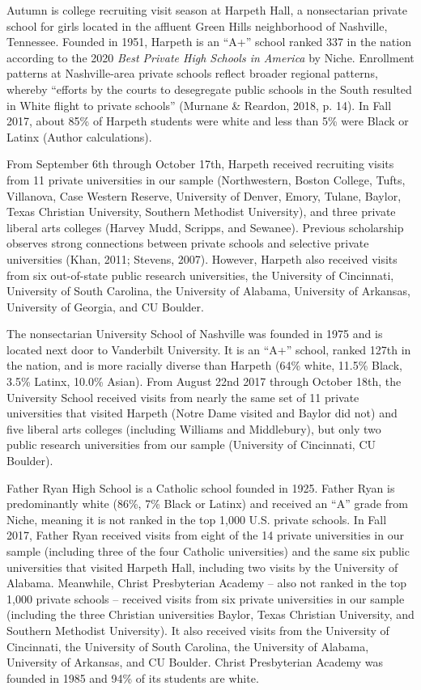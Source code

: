 \documentclass[
  12pt,
]{article}
\begin{document}
\bigskip

Autumn is college recruiting visit season at Harpeth Hall, a nonsectarian private school for girls located in the affluent Green Hills neighborhood of Nashville, Tennessee. Founded in 1951, Harpeth is an ``A+'' school ranked 337 in the nation according to the 2020 \emph{Best Private High Schools in America} by Niche. Enrollment patterns at Nashville-area private schools reflect broader regional patterns, whereby ``efforts by the courts to desegregate public schools in the South resulted in White flight to private schools'' (Murnane \& Reardon, 2018, p. 14). In Fall 2017, about 85\% of Harpeth students were white and less than 5\% were Black or Latinx (Author calculations).

From September 6th through October 17th, Harpeth received recruiting visits from 11 private universities in our sample (Northwestern, Boston College, Tufts, Villanova, Case Western Reserve, University of Denver, Emory, Tulane, Baylor, Texas Christian University, Southern Methodist University), and three private liberal arts colleges (Harvey Mudd, Scripps, and Sewanee). Previous scholarship observes strong connections between private schools and selective private universities (Khan, 2011; Stevens, 2007). However, Harpeth also received visits from six out-of-state public research universities, the University of Cincinnati, University of South Carolina, the University of Alabama, University of Arkansas, University of Georgia, and CU Boulder.

The nonsectarian University School of Nashville was founded in 1975 and is located next door to Vanderbilt University. It is an ``A+'' school, ranked 127th in the nation, and is more racially diverse than Harpeth (64\% white, 11.5\% Black, 3.5\% Latinx, 10.0\% Asian). From August 22nd 2017 through October 18th, the University School received visits from nearly the same set of 11 private universities that visited Harpeth (Notre Dame visited and Baylor did not) and five liberal arts colleges (including Williams and Middlebury), but only two public research universities from our sample (University of Cincinnati, CU Boulder).

Father Ryan High School is a Catholic school founded in 1925. Father Ryan is predominantly white (86\%, 7\% Black or Latinx) and received an ``A'' grade from Niche, meaning it is not ranked in the top 1,000 U.S. private schools. In Fall 2017, Father Ryan received visits from eight of the 14 private universities in our sample (including three of the four Catholic universities) and the same six public universities that visited Harpeth Hall, including two visits by the University of Alabama. Meanwhile, Christ Presbyterian Academy -- also not ranked in the top 1,000 private schools -- received visits from six private universities in our sample (including the three Christian universities Baylor, Texas Christian University, and Southern Methodist University). It also received visits from the University of Cincinnati, the University of South Carolina, the University of Alabama, University of Arkansas, and CU Boulder. Christ Presbyterian Academy was founded in 1985 and 94\% of its students are white.
\end{document}
